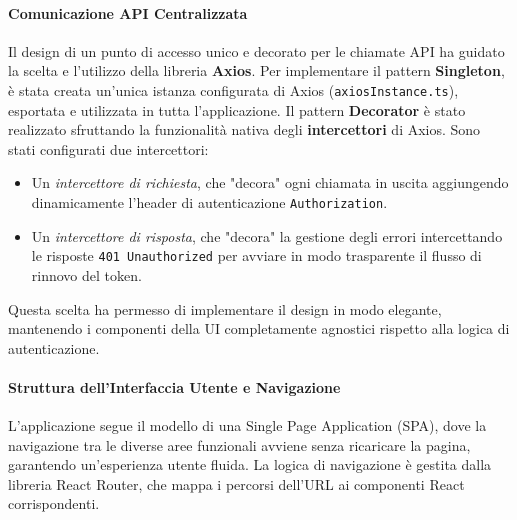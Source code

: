 \documentclass[12pt,a4paper,openright,twoside]{book}
\begin{document}
\paragraph{Comunicazione API Centralizzata}
Il design di un punto di accesso unico e decorato per le chiamate API ha guidato la scelta e l'utilizzo della libreria \textbf{Axios}. Per implementare il pattern \textbf{Singleton}, è stata creata un'unica istanza configurata di Axios (\texttt{axiosInstance.ts}), esportata e utilizzata in tutta l'applicazione. Il pattern \textbf{Decorator} è stato realizzato sfruttando la funzionalità nativa degli \textbf{intercettori} di Axios. Sono stati configurati due intercettori:
\begin{itemize}
    \item Un \textit{intercettore di richiesta}, che "decora" ogni chiamata in uscita aggiungendo dinamicamente l'header di autenticazione \texttt{Authorization}.
    \item Un \textit{intercettore di risposta}, che "decora" la gestione degli errori intercettando le risposte \texttt{401 Unauthorized} per avviare in modo trasparente il flusso di rinnovo del token.
\end{itemize}
Questa scelta ha permesso di implementare il design in modo elegante, mantenendo i componenti della UI completamente agnostici rispetto alla logica di autenticazione.


\paragraph{Struttura dell'Interfaccia Utente e Navigazione}
L'applicazione segue il modello di una Single Page Application (SPA), dove la navigazione tra le diverse aree funzionali avviene senza ricaricare la pagina, garantendo un'esperienza utente fluida. La logica di navigazione è gestita dalla libreria React Router, che mappa i percorsi dell'URL ai componenti React corrispondenti.
\end{document}
